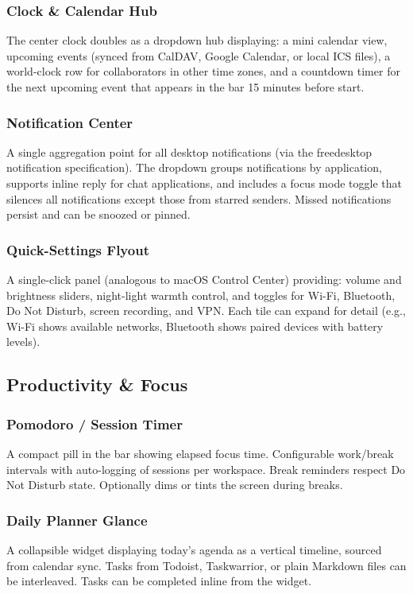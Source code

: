 \documentclass[11pt,a4paper]{article}
\begin{document}
\subsubsection{Clock \& Calendar Hub}
The center clock doubles as a dropdown hub displaying: a mini calendar view, upcoming events (synced from CalDAV, Google Calendar, or local ICS files), a world-clock row for collaborators in other time zones, and a countdown timer for the next upcoming event that appears in the bar 15 minutes before start.

\subsubsection{Notification Center}
A single aggregation point for all desktop notifications (via the freedesktop notification specification). The dropdown groups notifications by application, supports inline reply for chat applications, and includes a focus mode toggle that silences all notifications except those from starred senders. Missed notifications persist and can be snoozed or pinned.

\subsubsection{Quick-Settings Flyout}
A single-click panel (analogous to macOS Control Center) providing: volume and brightness sliders, night-light warmth control, and toggles for Wi-Fi, Bluetooth, Do Not Disturb, screen recording, and VPN. Each tile can expand for detail (e.g., Wi-Fi shows available networks, Bluetooth shows paired devices with battery levels).


\subsection{Productivity \& Focus}
\label{sec:features-productivity}

\subsubsection{Pomodoro / Session Timer}
A compact pill in the bar showing elapsed focus time. Configurable work/break intervals with auto-logging of sessions per workspace. Break reminders respect Do Not Disturb state. Optionally dims or tints the screen during breaks.

\subsubsection{Daily Planner Glance}
A collapsible widget displaying today's agenda as a vertical timeline, sourced from calendar sync. Tasks from Todoist, Taskwarrior, or plain Markdown files can be interleaved. Tasks can be completed inline from the widget.
\end{document}

